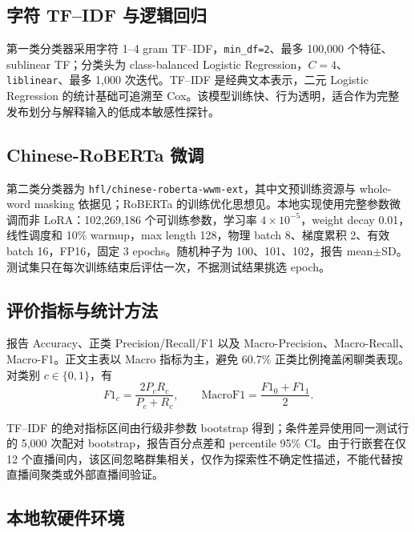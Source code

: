 \documentclass[UTF8,zihao=-4,a4paper]{ctexart}
\begin{document}
\subsection{字符 TF--IDF 与逻辑回归}

第一类分类器采用字符 1--4 gram TF--IDF，\texttt{min\_df=2}、最多 100,000 个特征、sublinear TF；分类头为 class-balanced Logistic Regression，$C=4$、\texttt{liblinear}、最多 1,000 次迭代。TF--IDF 是经典文本表示\cite{manning2008information}，二元 Logistic Regression 的统计基础可追溯至 Cox\cite{cox1958binary}。该模型训练快、行为透明，适合作为完整发布划分与解释输入的低成本敏感性探针。

\subsection{Chinese-RoBERTa 微调}

第二类分类器为 \texttt{hfl/chinese-roberta-wwm-ext}，其中文预训练资源与 whole-word masking 依据见\cite{cui2020revisiting,cui2021wholeword}；RoBERTa 的训练优化思想见\cite{liu2019roberta}。本地实现使用完整参数微调而非 LoRA：102,269,186 个可训练参数，学习率 $4\times10^{-5}$，weight decay 0.01，线性调度和 10\% warmup，max length 128，物理 batch 8、梯度累积 2、有效 batch 16，FP16，固定 3 epochs。随机种子为 100、101、102，报告 mean$\pm$SD。测试集只在每次训练结束后评估一次，不据测试结果挑选 epoch。

\subsection{评价指标与统计方法}

报告 Accuracy、正类 Precision/Recall/F1 以及 Macro-Precision、Macro-Recall、Macro-F1。正文主表以 Macro 指标为主，避免 60.7\% 正类比例掩盖闲聊类表现。对类别 $c\in\{0,1\}$，有
\begin{equation}
  F1_c=\frac{2P_cR_c}{P_c+R_c},\qquad
  \mathrm{MacroF1}=\frac{F1_0+F1_1}{2}.
\end{equation}

TF--IDF 的绝对指标区间由行级非参数 bootstrap 得到\cite{efron1979bootstrap,efron1986bootstrapci}；条件差异使用同一测试行的 5,000 次配对 bootstrap，报告百分点差和 percentile 95\% CI。由于行嵌套在仅 12 个直播间内，该区间忽略群集相关，仅作为探索性不确定性描述，不能代替按直播间聚类或外部直播间验证。

\subsection{本地软硬件环境}
\end{document}
